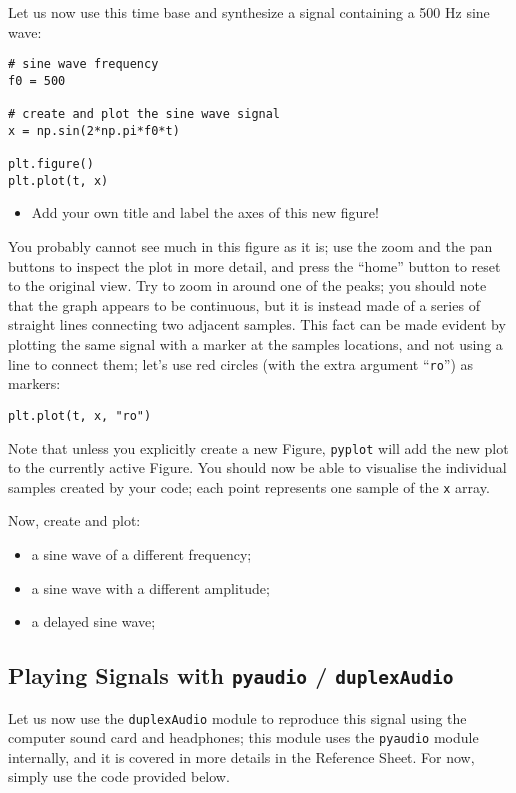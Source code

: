 Let us now use this time base and synthesize a signal containing a 500 Hz sine wave:

\begin{lstlisting}[frame=single]
# sine wave frequency
f0 = 500

# create and plot the sine wave signal
x = np.sin(2*np.pi*f0*t)

plt.figure()
plt.plot(t, x)
\end{lstlisting}

\begin{itemize}
	\item Add your own title and label the axes of this new figure!
\end{itemize}

You probably cannot see much in this figure as it is; use the zoom and the pan buttons to inspect the plot in more detail, and press the ``home'' button to reset to the original view. Try to zoom in around one of the peaks; you should note that the graph appears to be continuous, but it is instead made of a series of straight lines connecting two adjacent samples. This fact can be made evident by plotting the same signal with a marker at the samples locations, and not using a line to connect them; let's use red circles (with the extra argument ``{\tt ro}'') as markers:

\begin{lstlisting}[frame=single]
plt.plot(t, x, "ro")
\end{lstlisting}

Note that unless you explicitly create a new Figure, {\tt pyplot} will add the new plot to the currently active Figure. You should now be able to visualise the individual samples created by your code; each point represents one sample of the {\tt x} array.

Now, create and plot:

\begin{itemize}
	\item a sine wave of a different frequency;
	\item a sine wave with a different amplitude;
	\item a delayed sine wave;
\end{itemize}

\subsection{Playing Signals with {\tt pyaudio} / {\tt duplexAudio}}

Let us now use the {\tt duplexAudio} module to reproduce this signal using the computer sound card and headphones; this module uses the {\tt pyaudio} module internally, and it is covered in more details in the Reference Sheet. For now, simply use the code provided below.

